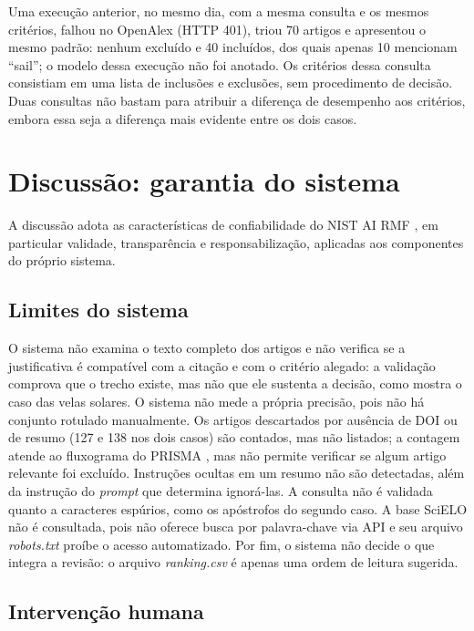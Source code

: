 \documentclass[10pt,a4paper,twocolumn]{article}
\newcommand{\cod}[1]{\textit{#1}}
\begin{document}
Uma execução anterior, no mesmo dia, com a mesma consulta e os mesmos critérios, falhou no OpenAlex (HTTP 401), triou 70 artigos e apresentou o mesmo padrão: nenhum excluído e 40 incluídos, dos quais apenas 10 mencionam ``sail''; o modelo dessa execução não foi anotado. Os critérios dessa consulta consistiam em uma lista de inclusões e exclusões, sem procedimento de decisão. Duas consultas não bastam para atribuir a diferença de desempenho aos critérios, embora essa seja a diferença mais evidente entre os dois casos.

\section{Discussão: garantia do sistema}

A discussão adota as características de confiabilidade do NIST AI RMF \cite{nist}, em particular validade, transparência e responsabilização, aplicadas aos componentes do próprio sistema.

\subsection{Limites do sistema}

O sistema não examina o texto completo dos artigos e não verifica se a justificativa é compatível com a citação e com o critério alegado: a validação comprova que o trecho existe, mas não que ele sustenta a decisão, como mostra o caso das velas solares. O sistema não mede a própria precisão, pois não há conjunto rotulado manualmente. Os artigos descartados por ausência de DOI ou de resumo (127 e 138 nos dois casos) são contados, mas não listados; a contagem atende ao fluxograma do PRISMA \cite{prisma}, mas não permite verificar se algum artigo relevante foi excluído. Instruções ocultas em um resumo \cite{greshake} não são detectadas, além da instrução do \emph{prompt} que determina ignorá-las. A consulta não é validada quanto a caracteres espúrios, como os apóstrofos do segundo caso. A base SciELO não é consultada, pois não oferece busca por palavra-chave via API e seu arquivo \cod{robots.txt} proíbe o acesso automatizado. Por fim, o sistema não decide o que integra a revisão: o arquivo \cod{ranking.csv} é apenas uma ordem de leitura sugerida.

\subsection{Intervenção humana}
\end{document}
